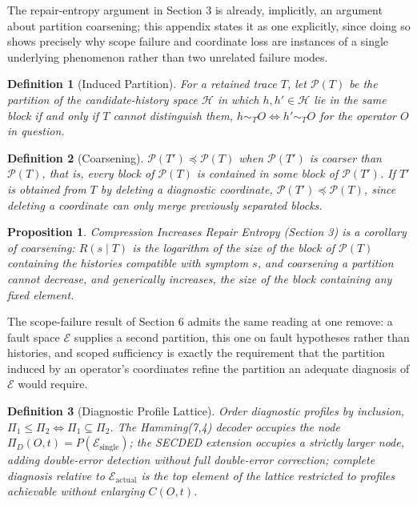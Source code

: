 \documentclass[11pt]{article}
\newtheorem{definition}{Definition}[section]
\newtheorem{proposition}{Proposition}[section]
\begin{document}
The repair-entropy argument in Section 3 is already, implicitly, an argument about partition coarsening; this appendix states it as one explicitly, since doing so shows precisely why scope failure and coordinate loss are instances of a single underlying phenomenon rather than two unrelated failure modes.

\begin{definition}[Induced Partition]
For a retained trace $T$, let $\mathcal{P}(T)$ be the partition of the candidate-history space $\mathcal{H}$ in which $h, h' \in \mathcal{H}$ lie in the same block if and only if $T$ cannot distinguish them, $h \sim_T O \Leftrightarrow h' \sim_T O$ for the operator $O$ in question.
\end{definition}

\begin{definition}[Coarsening]
$\mathcal{P}(T') \preceq \mathcal{P}(T)$ when $\mathcal{P}(T')$ is coarser than $\mathcal{P}(T)$, that is, every block of $\mathcal{P}(T)$ is contained in some block of $\mathcal{P}(T')$. If $T'$ is obtained from $T$ by deleting a diagnostic coordinate, $\mathcal{P}(T') \preceq \mathcal{P}(T)$, since deleting a coordinate can only merge previously separated blocks.
\end{definition}

\begin{proposition}
Compression Increases Repair Entropy (Section 3) is a corollary of coarsening: $R(s \mid T)$ is the logarithm of the size of the block of $\mathcal{P}(T)$ containing the histories compatible with symptom $s$, and coarsening a partition cannot decrease, and generically increases, the size of the block containing any fixed element.
\end{proposition}

The scope-failure result of Section 6 admits the same reading at one remove: a fault space $\mathcal{E}$ supplies a second partition, this one on fault hypotheses rather than histories, and scoped sufficiency is exactly the requirement that the partition induced by an operator's coordinates refine the partition an adequate diagnosis of $\mathcal{E}$ would require.

\begin{definition}[Diagnostic Profile Lattice]
Order diagnostic profiles by inclusion, $\Pi_1 \leq \Pi_2 \iff \Pi_1 \subseteq \Pi_2$. The Hamming(7,4) decoder occupies the node $\Pi_D(O,t) = P(\mathcal{E}_{\text{single}})$; the SECDED extension occupies a strictly larger node, adding double-error detection without full double-error correction; complete diagnosis relative to $\mathcal{E}_{\text{actual}}$ is the top element of the lattice restricted to profiles achievable without enlarging $C(O,t)$.
\end{definition}
\end{document}
